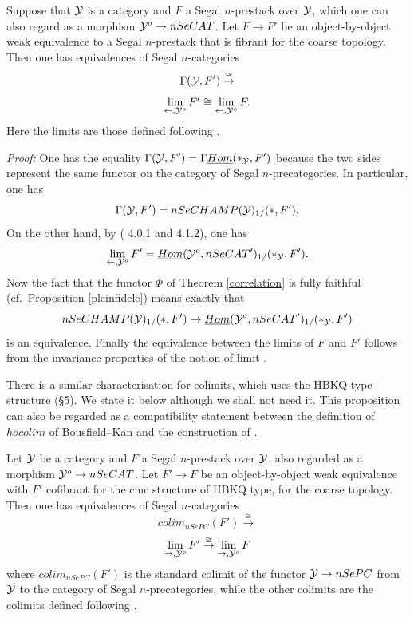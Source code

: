 \begin{proposition}
\label{calclim}
Suppose that ${\cal Y}$ is a category and $F$ a Segal $n$-prestack over ${\cal Y}$,
which one can also regard as a morphism ${\cal Y} ^o\rightarrow nSeCAT$. Let
$F\rightarrow F'$ be an object-by-object weak equivalence to a Segal
$n$-prestack that is fibrant for the coarse topology. Then one has
equivalences of Segal $n$-categories
$$
\Gamma ({\cal Y} , F')
\stackrel{\cong}{\rightarrow}
$$
$$
\lim _{\leftarrow , {\cal Y} ^o} F' \cong
\lim _{\leftarrow , {\cal Y} ^o} F .
$$
Here the limits are those defined following \cite{limits}.
\end{proposition}
{\em Proof:}
One has the equality
$\Gamma ({\cal Y} , F')=\Gamma \underline{Hom}(\ast _{{\cal Y}}, F')$ because the two
sides represent the same functor on the category of Segal $n$-precategories.
In particular, one has
$$
\Gamma ({\cal Y} , F')= nSeCHAMP ({\cal Y} )_{1/}(\ast, F').
$$
On the other hand, by (\cite{limits} 4.0.1 and 4.1.2), one has
$$
\lim _{\leftarrow , {\cal Y} ^o} F' = \underline{Hom}({\cal Y} ^o, nSeCAT')_{1/} (\ast
_{{\cal Y}}, F').
$$
Now the fact that the functor $\Phi$ of Theorem \ref{correlation} is fully
faithful (cf.\ Proposition \ref{pleinfidele}) means exactly that
$$
nSeCHAMP ({\cal Y} )_{1/}(\ast, F')\rightarrow
\underline{Hom}({\cal Y} ^o, nSeCAT')_{1/} (\ast
_{{\cal Y}}, F')
$$
is an equivalence. Finally the equivalence between the limits of $F$ and $F'$
follows from the invariance properties of the notion of limit
\cite{limits}.
\eop

There is a similar characterisation for colimits, which uses the HBKQ-type
structure (\S5). We state it below although we shall not need it. This
proposition can also be regarded as a compatibility statement between the
definition of $hocolim$ of Bousfield--Kan and the construction of
\cite{limits}.

\begin{proposition}
\label{calccolim}
Let ${\cal Y}$ be a category and $F$ a Segal $n$-prestack over ${\cal Y}$, also regarded
as a morphism ${\cal Y} ^o\rightarrow nSeCAT$. Let $F'\rightarrow F$ be an
object-by-object weak equivalence with $F'$ cofibrant for the cmc structure of
HBKQ type, for the coarse topology. Then one has equivalences of Segal
$n$-categories
$$
colim_{nSePC}(F')
\stackrel{\cong}{\rightarrow}
$$
$$
\lim _{\rightarrow , {\cal Y} ^o} F' \stackrel{\cong}{\rightarrow}
\lim _{\rightarrow , {\cal Y} ^o} F
$$
where $colim_{nSePC}(F')$ is the standard colimit of the functor
${\cal Y} \rightarrow nSePC$ from ${\cal Y}$ to the category of Segal $n$-precategories,
while the other colimits are the colimits defined following \cite{limits}.
\end{proposition}
\eop

